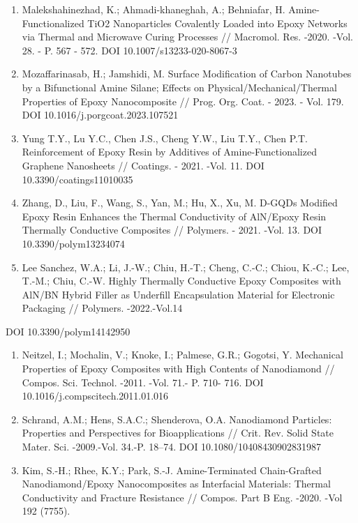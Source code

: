 \begin{enumerate}
\def\labelenumi{\arabic{enumi}.}
\setcounter{enumi}{12}
\item
  Malekshahinezhad, K.; Ahmadi-khaneghah, A.; Behniafar, H.
  Amine-Functionalized TiO2 Nanoparticles Covalently Loaded into Epoxy
  Networks via Thermal and Microwave Curing Processes // Macromol. Res.
  -2020. -Vol. 28. - P. 567 - 572. DOI 10.1007/s13233-020-8067-3
\item
  Mozaffarinasab, H.; Jamshidi, M. Surface Modification of Carbon
  Nanotubes by a Bifunctional Amine Silane; Effects on
  Physical/Mechanical/Thermal Properties of Epoxy Nanocomposite // Prog.
  Org. Coat. - 2023. - Vol. 179. DOI 10.1016/j.porgcoat.2023.107521
\item
  Yung T.Y., Lu Y.C., Chen J.S., Cheng Y.W., Liu T.Y., Chen P.T.
  Reinforcement of Epoxy Resin by Additives of Amine-Functionalized
  Graphene Nanosheets // Coatings. - 2021. -Vol. 11. DOI
  10.3390/coatings11010035
\item
  Zhang, D., Liu, F., Wang, S., Yan, M.; Hu, X., Xu, M. D-GQDs Modified
  Epoxy Resin Enhances the Thermal Conductivity of AlN/Epoxy Resin
  Thermally Conductive Composites // Polymers. - 2021. -Vol. 13. DOI
  10.3390/polym13234074
\item
  Lee Sanchez, W.A.; Li, J.-W.; Chiu, H.-T.; Cheng, C.-C.; Chiou, K.-C.;
  Lee, T.-M.; Chiu, C.-W. Highly Thermally Conductive Epoxy Composites
  with AlN/BN Hybrid Filler as Underfill Encapsulation Material for
  Electronic Packaging // Polymers. -2022.-Vol.14
\end{enumerate}

DOI 10.3390/polym14142950

\begin{enumerate}
\def\labelenumi{\arabic{enumi}.}
\setcounter{enumi}{17}
\item
  Neitzel, I.; Mochalin, V.; Knoke, I.; Palmese, G.R.; Gogotsi, Y.
  Mechanical Properties of Epoxy Composites with High Contents of
  Nanodiamond // Compos. Sci. Technol. -2011. -Vol. 71.- P. 710- 716.
  DOI 10.1016/j.compscitech.2011.01.016
\item
  Schrand, A.M.; Hens, S.A.C.; Shenderova, O.A. Nanodiamond Particles:
  Properties and Perspectives for Bioapplications // Crit. Rev. Solid
  State Mater. Sci. -2009.-Vol. 34.-P. 18--74. DOI
  10.1080/10408430902831987
\item
  Kim, S.-H.; Rhee, K.Y.; Park, S.-J. Amine-Terminated Chain-Grafted
  Nanodiamond/Epoxy Nanocomposites as Interfacial Materials: Thermal
  Conductivity and Fracture Resistance // Compos. Part B Eng. -2020.
  -Vol 192 (7755).
\end{enumerate}

